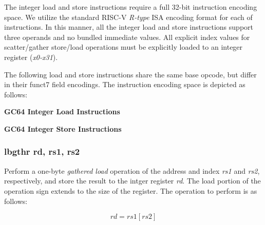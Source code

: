 \documentclass{article}
\begin{document}
The integer load and store instructions require a full 32-bit
instruction encoding space.  We utilize the standard RISC-V
\emph{R-type} ISA encoding format for each of instructions.  In
this manner, all the integer load and store instructions support
three operands and no bundled immediate values.  All explicit index
values for scatter/gather store/load operations must be explicitly
loaded to an integer register (\emph{x0-x31}).

The following load and store instructions share the same base
opcode, but differ in their funct7 field encodings.  The instruction
encoding space is depicted as follows:


\begin{center}
\textbf{GC64 Integer Load Instructions}
\makebox[0.03in][s]{}\makebox[0.03in][s]{}\makebox[0.03in][s]{}\makebox[0.03in][s]{}\makebox[0.03in][s]{}
\end{center}

\begin{center}
\textbf{GC64 Integer Store Instructions}
\makebox[0.03in][s]{}\makebox[0.03in][s]{}\makebox[0.03in][s]{}\makebox[0.03in][s]{}\makebox[0.03in][s]{}
\end{center}



\subsubsection{lbgthr rd, rs1, rs2}

Perform a one-byte \emph{gathered load} operation of the address and
index \emph{rs1} and \emph{rs2}, respectively, and store the result
to the intger register \emph{rd}.  The load portion of the operation
sign extends to the size of the register.  
The operation to perform is as follows:

\begin{equation}
rd = rs1[rs2]
\end{equation}
\end{document}
